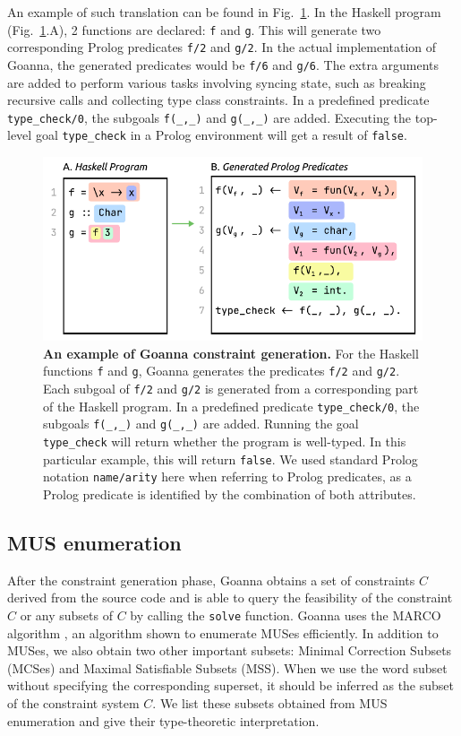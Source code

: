 \documentclass[pdflatex,lineno,sn-nature,Numbered]{sn-jnl}%
\begin{document}
  
    An example of such translation can be found in Fig.~\ref{fig:translation-example}. In the Haskell program (Fig.~\ref{fig:translation-example}.A), 2 functions are declared: \texttt{f} and \texttt{g}. This will generate two corresponding Prolog predicates \texttt{f/2} and \texttt{g/2}. In the actual implementation of Goanna, the generated predicates would be \texttt{f/6} and \texttt{g/6}. The extra arguments are added to perform various tasks involving syncing state, such as breaking recursive calls and collecting type class constraints. In a predefined predicate \texttt{type\_check/0}, the subgoals \texttt{f(\_,\_)} and \texttt{g(\_,\_)} are added. Executing the top-level goal \texttt{type\_check} in a Prolog environment will get a result of \texttt{false}.
    
  \begin{figure}[htb]
        \centering
    \includegraphics[width=0.7\linewidth]{images/Translation-Example}
        \caption[An example of Goanna constraint generation]{\textbf{An example of Goanna constraint generation.} For the Haskell functions \texttt{f} and \texttt{g}, Goanna generates the predicates \texttt{f/2} and \texttt{g/2}. Each subgoal of \texttt{f/2} and \texttt{g/2} is generated from a corresponding part of the Haskell program. In a predefined predicate \texttt{type\_check/0}, the subgoals \texttt{f(\_,\_)} and \texttt{g(\_,\_)} are added. Running the goal \texttt{type\_check} will return whether the program is well-typed. In this particular example, this will return \texttt{false}. We used standard Prolog notation \texttt{name/arity} here when referring to Prolog predicates, as a Prolog predicate is identified by the combination of both attributes. 
}
        \label{fig:translation-example}
    \end{figure}
    

    \subsection{MUS enumeration} \label{sub:enumeration}
    After the constraint generation phase, Goanna obtains a set of constraints $C$ derived from the source code and is able to query the feasibility of the constraint $C$ or any subsets of $C$ by calling the \texttt{solve} function. Goanna uses the MARCO algorithm \cite{Liffiton2016-xi}, an algorithm shown to enumerate MUSes efficiently. In addition to MUSes, we also obtain two other important subsets: Minimal Correction Subsets (MCSes) and Maximal Satisfiable Subsets (MSS). When we use the word subset without specifying the corresponding superset, it should be inferred as the subset of the constraint system $C$. We list these subsets obtained from MUS enumeration and give their type-theoretic interpretation. 
        
\end{document}
